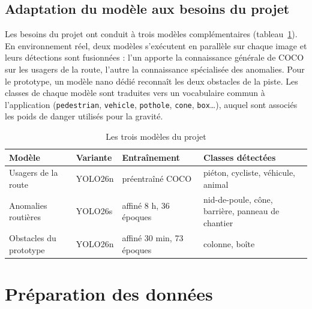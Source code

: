 \subsection{Adaptation du modèle aux besoins du projet}
Les besoins du projet ont conduit à trois modèles complémentaires (tableau~\ref{tab:modeles}). En environnement
réel, deux modèles s'exécutent en parallèle sur chaque image et leurs détections sont fusionnées : l'un apporte la
connaissance générale de COCO sur les usagers de la route, l'autre la connaissance spécialisée des anomalies. Pour le
prototype, un modèle nano dédié reconnaît les deux obstacles de la piste. Les classes de chaque modèle sont
traduites vers un vocabulaire commun à l'application (\texttt{pedestrian}, \texttt{vehicle}, \texttt{pothole},
\texttt{cone}, \texttt{box}…), auquel sont associés les poids de danger utilisés pour la gravité.

\begin{table}[H]
\centering\small
\caption{Les trois modèles du projet}
\label{tab:modeles}
\begin{tabularx}{\linewidth}{l l l X}
\toprule
\textbf{Modèle} & \textbf{Variante} & \textbf{Entraînement} & \textbf{Classes détectées} \\
\midrule
Usagers de la route & YOLO26n & préentraîné COCO & piéton, cycliste, véhicule, animal \\
Anomalies routières & YOLO26s & affiné 8 h, 36 époques & nid-de-poule, cône, barrière, panneau de chantier \\
Obstacles du prototype & YOLO26n & affiné 30 min, 73 époques & colonne, boîte \\
\bottomrule
\end{tabularx}
\end{table}

\section{Préparation des données}

